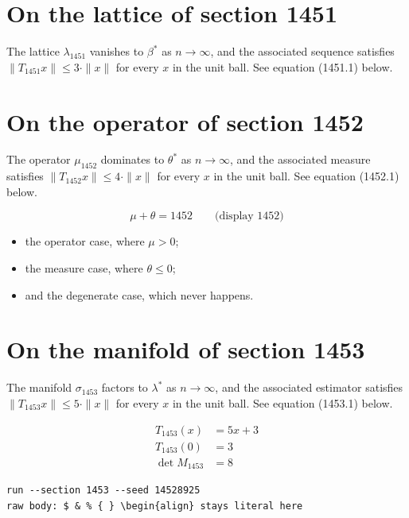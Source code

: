 \documentclass{article}
\begin{document}
\section{On the lattice of section 1451}
The lattice $\lambda_{1451}$ vanishes to $\beta^{*}$ as $n \to \infty$,
and the associated sequence satisfies $\|T_{1451} x\| \leq 3 \cdot \|x\|$
for every $x$ in the unit ball. See equation (1451.1) below.

\section{On the operator of section 1452}
The operator $\mu_{1452}$ dominates to $\theta^{*}$ as $n \to \infty$,
and the associated measure satisfies $\|T_{1452} x\| \leq 4 \cdot \|x\|$
for every $x$ in the unit ball. See equation (1452.1) below.

$$
\mu + \theta = 1452 \qquad \text{(display 1452)}
$$

\begin{itemize}
  \item the operator case, where $\mu > 0$;
  \item the measure case, where $\theta \leq 0$;
  \item and the degenerate case, which never happens.
\end{itemize}

\section{On the manifold of section 1453}
The manifold $\sigma_{1453}$ factors to $\lambda^{*}$ as $n \to \infty$,
and the associated estimator satisfies $\|T_{1453} x\| \leq 5 \cdot \|x\|$
for every $x$ in the unit ball. See equation (1453.1) below.

\begin{align}
T_{1453}(x) &= 5 x + 3 \\
T_{1453}(0) &= 3 \\
\det M_{1453} &= 8
\end{align}

\begin{verbatim}
run --section 1453 --seed 14528925
raw body: $ & % { } \begin{align} stays literal here
\end{verbatim}
\end{document}
